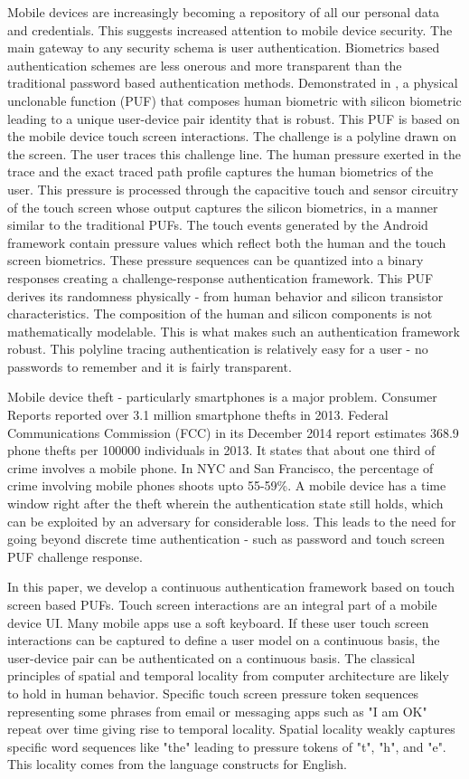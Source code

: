 \documentclass{acm_proc_article-sp}
\begin{document}
Mobile devices are increasingly becoming a repository of all our personal data and credentials.
This suggests increased attention to mobile device security. The main gateway to any security
schema is user authentication. Biometrics based authentication schemes are less onerous and 
more transparent than the traditional password based authentication methods. 
Demonstrated in \cite{ScheelTyagi15}, a physical unclonable function (PUF) that composes human biometric with silicon biometric
leading to a unique user-device pair identity that is robust. This PUF is based on the mobile
device touch screen interactions. The challenge is a polyline drawn on the screen. The user
traces this challenge line. The human pressure exerted in the trace and the exact traced path
profile captures the human biometrics of the user. This pressure is
processed through the capacitive touch
and sensor circuitry of the touch screen whose output captures the silicon biometrics, in a 
manner similar to the traditional PUFs. The touch events generated by the Android framework
contain pressure values which reflect both the human and the touch screen biometrics.
These pressure sequences can be quantized into a binary responses creating a challenge-response
authentication framework. This PUF derives its randomness physically - from human behavior and silicon
transistor characteristics. The composition of the human and silicon components is not mathematically
modelable. This is what makes such an authentication framework robust. This polyline tracing authentication is relatively easy for a user - no passwords to remember
and it is fairly transparent.
 

Mobile device theft - particularly smartphones is a major problem. Consumer Reports \cite{CR14}
reported over 3.1 million smartphone thefts in 2013. Federal Communications Commission (FCC)
\cite{FCC14}
in its December 2014 report estimates 368.9 phone thefts per 100000 individuals in 2013. It states 
that about one third of crime involves a mobile phone. In NYC and San Francisco, the percentage
of crime involving mobile phones shoots upto 55-59\%. A mobile device has a time window right after
the theft wherein the authentication state still holds, which can be exploited by an adversary for considerable loss. This leads to the need for going beyond discrete time authentication - such as
password and touch screen PUF challenge response.

In this paper, we develop a continuous authentication framework based on touch screen based PUFs.
Touch screen interactions are an integral part of a mobile device UI. Many mobile apps use a soft keyboard. 
 If these user touch screen interactions can be captured to define a 
user model on a continuous basis, the user-device pair can be authenticated on a continuous
basis. The classical principles of spatial and temporal locality from computer architecture
are likely to hold in human behavior. Specific touch screen pressure token sequences representing
some phrases from email or messaging apps such as "I am OK" repeat over time giving rise
to temporal locality. Spatial locality weakly captures specific word sequences like "the" 
leading to pressure tokens of "t", "h", and "e". This locality comes from the language constructs for
English.
\end{document}
